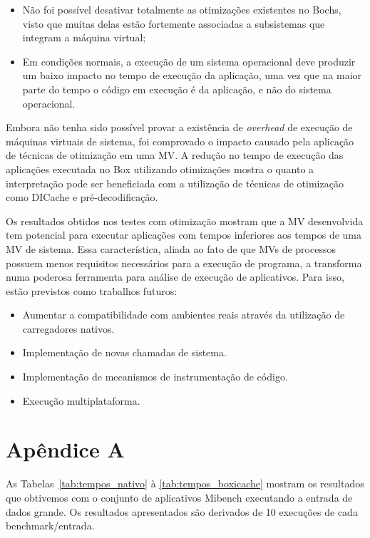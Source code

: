 \documentclass[11pt,twoside]{article}
\begin{document}
\begin{itemize}
 \item Não foi possível desativar totalmente as otimizações existentes no Bochs,
   visto que muitas delas estão fortemente associadas a subsistemas que integram
   a máquina virtual;
 \item Em condições normais, a execução de um sistema operacional deve produzir
   um baixo impacto no tempo de execução da aplicação, uma vez que na maior parte do tempo o código em execução é da aplicação, e não do sistema operacional.
\end{itemize}

Embora não tenha sido possível provar a existência de \emph{overhead} de
execução de máquinas virtuais de sistema, foi comprovado o impacto causado pela
aplicação de técnicas de otimização em uma MV. A redução no tempo
de execução das aplicações executada no Box utilizando otimizações mostra o
quanto a interpretação pode ser beneficiada com a utilização de técnicas de
otimização como DICache e pré-decodificação.

Os resultados obtidos nos testes com otimização mostram que a MV desenvolvida
tem potencial para executar aplicações com tempos inferiores aos tempos de uma
MV de sistema. Essa característica, aliada ao fato de que MVs de processos
possuem menos requisitos necessários para a execução de programa, a transforma
numa poderosa ferramenta para análise de execução de aplicativos. Para isso,
estão previstos como trabalhos futuros:

\begin{itemize}
	\item Aumentar a compatibilidade com ambientes reais através da utilização de carregadores nativos.
	\item Implementação de novas chamadas de sistema.
	\item Implementação de mecanismos de instrumentação de código.
	\item Execução multiplataforma.
\end{itemize}

\newpage

\section*{Apêndice A} \label{ap:results}

As Tabelas~\ref{tab:tempos_nativo} à \ref{tab:tempos_boxicache} mostram os 
resultados que obtivemos com o conjunto de aplicativos Mibench executando a 
entrada de dados grande. Os resultados apresentados são derivados de 10 
execuções de cada benchmark/entrada.
\end{document}
